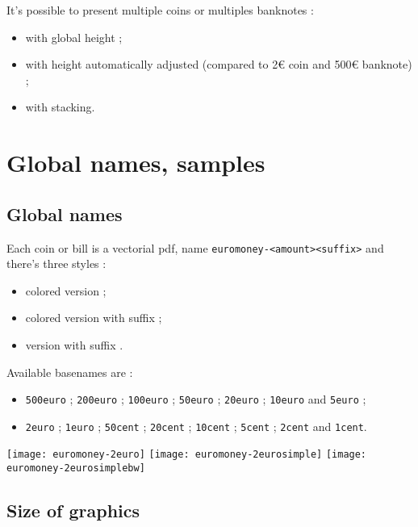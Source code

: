 \documentclass[11pt,a4paper]{ltxdoc}
\begin{document}
It's possible to present multiple coins or multiples banknotes :

\begin{itemize}
	\item with global height ;
	\item with height automatically adjusted (compared to 2€ coin and 500€ banknote) ;
	\item with stacking.
\end{itemize}

\section{Global names, samples}

\subsection{Global names}

Each coin or bill is a vectorial pdf, name \texttt{euromoney-<amount><suffix>} and there's three styles :

\begin{itemize}
	\item {} colored version ;
	\item {} colored version with  suffix ;
	\item {} version with  suffix .
\end{itemize}

Available basenames are :

\begin{itemize}
	\item \texttt{500euro} ; \texttt{200euro} ; \texttt{100euro} ; \texttt{50euro} ; \texttt{20euro} ; \texttt{10euro} and \texttt{5euro} ;
	\item \texttt{2euro} ; \texttt{1euro} ; \texttt{50cent} ; \texttt{20cent} ; \texttt{10cent} ; \texttt{5cent} ; \texttt{2cent} and \texttt{1cent}.
\end{itemize}

\begin{DemoCode}{}
\texttt{[image: euromoney-2euro]}%
\texttt{[image: euromoney-2eurosimple]}%
\texttt{[image: euromoney-2eurosimplebw]}%
\end{DemoCode}

\subsection{Size of graphics}
\end{document}
